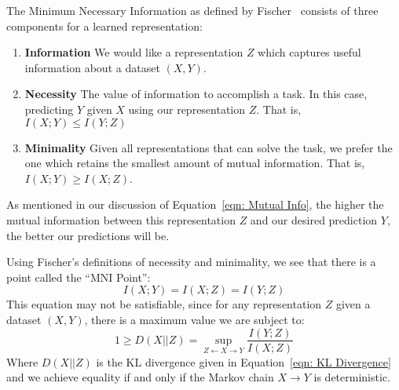 The Minimum Necessary Information as defined by Fischer~\cite{fischer2020conditional} consists of three components for a learned representation:
\begin{enumerate}
	\item \textbf{Information} We would like a representation $Z$ which captures useful information about a dataset $(X, Y)$.
	\item \textbf{Necessity} The value of information to accomplish a task. In this case, predicting $Y$ given $X$ using our representation $Z$. That is, $I(X; Y) \leq I(Y; Z)$
	\item \textbf{Minimality} Given all representations that can solve the task, we prefer the one which retains the smallest amount of mutual information. That is, $I(X; Y) \geq I(X; Z)$.
\end{enumerate}
As mentioned in our discussion of Equation~\ref{eqn: Mutual Info}, the higher the mutual information between this representation $Z$ and our desired prediction $Y$, the better our predictions will be. 

Using Fischer's definitions of necessity and minimality, we see that there is a point called the ``MNI Point'':
\begin{equation}
	I(X; Y) = I(X; Z) = I(Y; Z)
\end{equation}
This equation may not be satisfiable, since for any representation $Z$ given a dataset $(X, Y)$, there is a maximum value we are subject to:
\begin{equation}\label{eqn:MNI}
	1 \geq D(X||Z) = \sup_{Z \leftarrow X \rightarrow Y}\frac{I(Y; Z)}{I(X; Z)}
\end{equation}
Where $D(X||Z)$ is the KL divergence given in Equation~\ref{eqn: KL Divergence} and we achieve equality if and only if the Markov chain $X \to Y$ is deterministic.


